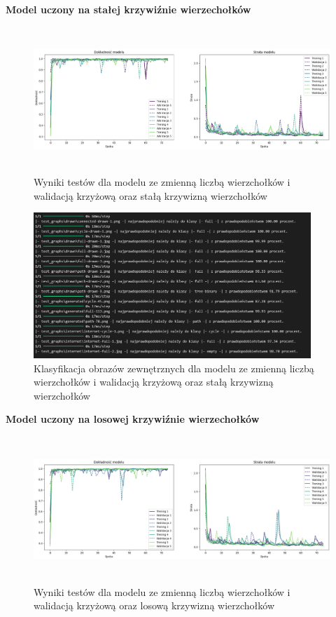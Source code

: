 \textbf{Model uczony na stałej krzywiźnie wierzechołków}

\begin{figure}[ht]
	\centering
	\includegraphics[height=5.5cm]{resources/tests/images/v2/multiple_edges_crossvalid_img.png}
	\caption{Wyniki testów dla modelu ze zmienną liczbą wierzchołków i walidacją krzyżową oraz stałą krzywizną wierzchołków}
	\label{Fig:tests-csvar-1}
\end{figure}
\FloatBarrier

\begin{figure}[ht]
	\centering
	\includegraphics[height=5.5cm]{resources/tests/images/v2/multiple_edges_crossvalid_txt.png}
	\caption{Klasyfikacja obrazów zewnętrznych dla modelu ze zmienną liczbą wierzchołków i walidacją krzyżową oraz stałą krzywizną wierzchołków}
	\label{Fig:tests-csvar-2}
\end{figure}
\FloatBarrier

\textbf{Model uczony na losowej krzywiźnie wierzechołków}

\begin{figure}[ht]
	\centering
	\includegraphics[height=5.5cm]{resources/tests/images/v3/multiple_edges_crossvalid_img.png}
	\caption{Wyniki testów dla modelu ze zmienną liczbą wierzchołków i walidacją krzyżową oraz losową krzywizną wierzchołków}
	\label{Fig:tests-csvar-1}
\end{figure}
\FloatBarrier

